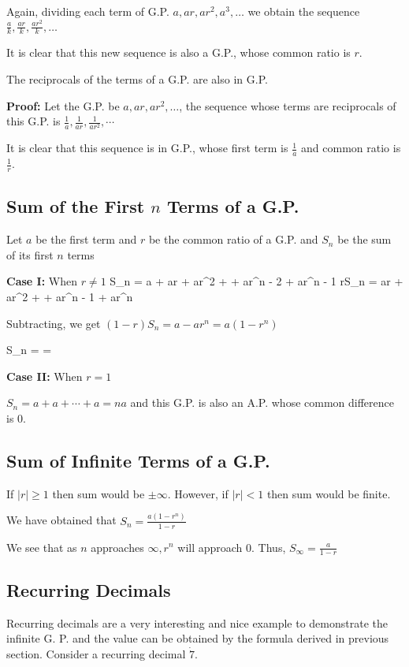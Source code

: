   Again, dividing each term of G.P. $a, ar, ar^2, a^3, \ldots$ we obtain the sequence $\frac{a}{k}, \frac{ar}{k}, \frac{ar^2}{k},
  \ldots$

  It is clear that this new sequence is also a G.P., whose common ratio is $r$.
\item The reciprocals of the terms of a G.P. are also in G.P.

  {\bf Proof:} Let the G.P. be $a, ar, ar^2, \ldots$, the sequence whose terms are reciprocals of this G.P. is $\frac{1}{a},
  \frac{1}{ar}, \frac{1}{ar^2}, \cdots$

  It is clear that this sequence is in G.P., whose first term is $\frac{1}{a}$ and common ratio is $\frac{1}{r}$.
\stopitemize

\subsection{Sum of the First $n$ Terms of a G.P.}
Let $a$ be the first term and $r$ be the common ratio of a G.P. and $S_n$ be the sum of its first $n$ terms

{\bf Case I:} When $r\neq 1$
\startformula S_n = a + ar + ar^2 + \cdots + ar^{n - 2} + ar^{n - 1}\stopformula
\startformula rS_n = ar + ar^2 + \cdots + ar^{n - 1} + ar^n\stopformula

Subtracting, we get $(1 - r)S_n = a - ar^n = a(1 - r^n)$

\startformula\therefore S_n =  = \stopformula

{\bf Case II:} When $r = 1$

$S_n = a + a + \cdots + a = na$ and this G.P. is also an A.P. whose common difference is $0$.

\subsection{Sum of Infinite Terms of a G.P.}
If $|r|\geq 1$ then sum would be $\pm\infty$. However, if $|r|< 1$ then sum would be finite.

We have obtained that $S_n = \frac{a(1 - r^n)}{1 - r}$

We see that as $n$ approaches $\infty, r^n$ will approach $0$. Thus, $S_\infty = \frac{a}{1 - r}$

\subsection{Recurring Decimals}
Recurring decimals are a very interesting and nice example to demonstrate the infinite G. P. and the value can be obtained by the
formula derived in previous section. Consider a recurring decimal $\dot{7}$.

